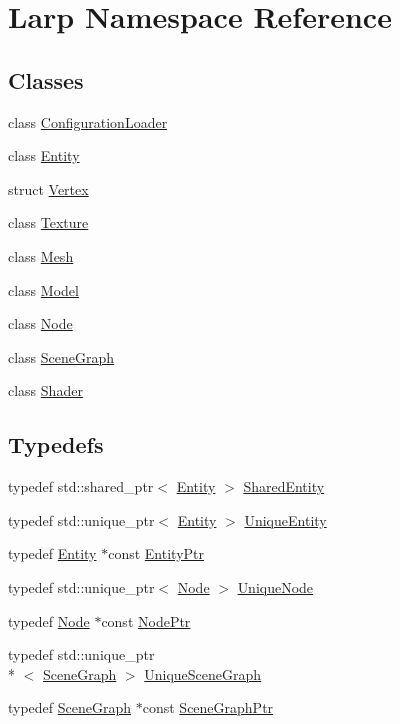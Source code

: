 \hypertarget{namespaceLarp}{\section{Larp Namespace Reference}
\label{namespaceLarp}
}
\subsection*{Classes}
\begin{DoxyCompactItemize}
\item 
class \hyperlink{classLarp_1_1ConfigurationLoader}{Configuration\-Loader}
\item 
class \hyperlink{classLarp_1_1Entity}{Entity}
\item 
struct \hyperlink{structLarp_1_1Vertex}{Vertex}
\item 
class \hyperlink{classLarp_1_1Texture}{Texture}
\item 
class \hyperlink{classLarp_1_1Mesh}{Mesh}
\item 
class \hyperlink{classLarp_1_1Model}{Model}
\item 
class \hyperlink{classLarp_1_1Node}{Node}
\item 
class \hyperlink{classLarp_1_1SceneGraph}{Scene\-Graph}
\item 
class \hyperlink{classLarp_1_1Shader}{Shader}
\end{DoxyCompactItemize}
\subsection*{Typedefs}
\begin{DoxyCompactItemize}
\item 
typedef std\-::shared\-\_\-ptr$<$ \hyperlink{classLarp_1_1Entity}{Entity} $>$ \hyperlink{namespaceLarp_ae3ffca1f126e4263cbdc59b116ee465a}{Shared\-Entity}
\item 
typedef std\-::unique\-\_\-ptr$<$ \hyperlink{classLarp_1_1Entity}{Entity} $>$ \hyperlink{namespaceLarp_ad6d203c6dc3d8ea7a5517a64e1665403}{Unique\-Entity}
\item 
typedef \hyperlink{classLarp_1_1Entity}{Entity} $\ast$const \hyperlink{namespaceLarp_a775efcc4cabb308d50168c52df343353}{Entity\-Ptr}
\item 
typedef std\-::unique\-\_\-ptr$<$ \hyperlink{classLarp_1_1Node}{Node} $>$ \hyperlink{namespaceLarp_ad95a88bc34f8c78cefd64c9bbeb94a58}{Unique\-Node}
\item 
typedef \hyperlink{classLarp_1_1Node}{Node} $\ast$const \hyperlink{namespaceLarp_a171c1dc8b70cfb441b15d7386780db23}{Node\-Ptr}
\item 
typedef std\-::unique\-\_\-ptr\\*
$<$ \hyperlink{classLarp_1_1SceneGraph}{Scene\-Graph} $>$ \hyperlink{namespaceLarp_a81a0d129ec1fc8f1f9fa231fbba6b19b}{Unique\-Scene\-Graph}
\item 
typedef \hyperlink{classLarp_1_1SceneGraph}{Scene\-Graph} $\ast$const \hyperlink{namespaceLarp_acf02d81e4b52238dcd17cb6249eadadc}{Scene\-Graph\-Ptr}
\end{DoxyCompactItemize}


